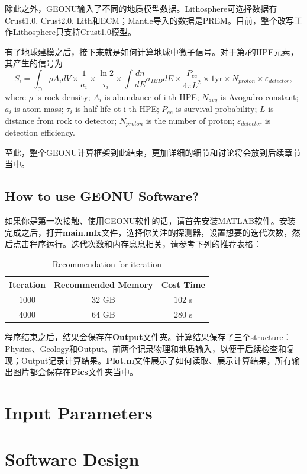			除此之外，GEONU输入了不同的地质模型数据。Lithosphere可选择数据有Crust1.0, Crust2.0, Lith和ECM；Mantle导入的数据是PREM。目前，整个改写工作Lithosphere只支持Crust1.0模型。\par
			有了地球建模之后，接下来就是如何计算地球中微子信号。对于第$i$的HPE元素，其产生的信号为
				\begin{equation}
					S_i
					= \int_{\oplus} \rho A_i dV \times \frac{1}{a_i} \times \frac{\ln 2}{\tau_i}\times \int \frac{dn}{dE} \sigma_{IBD} dE \times \frac{P_{ee}}{4\pi L^2} \times 1 \text{yr} \times N_{proton} \times \varepsilon_{detector},
				\end{equation}
			where $\rho$ is rock density; $A_i$ is abundance of i-th HPE; $N_{avg}$ is Avogadro constant; $a_i$ is atom mass; $\tau_i$ is half-life ot i-th HPE; $P_{ee}$ is survival probability; $L$ is distance from rock to detector; $N_{proton}$ is the number of proton; $\varepsilon_{detector}$ is detection efficiency.\par
			至此，整个GEONU计算框架到此结束，更加详细的细节和讨论将会放到后续章节当中。
		\section{How to use GEONU Software?}
			如果你是第一次接触、使用GEONU软件的话，请首先安装MATLAB软件。安装完成之后，打开\textbf{main.mlx}文件，选择你关注的探测器，设置想要的迭代次数，然后点击程序运行。迭代次数和内存息息相关，请参考下列的推荐表格：
				\begin{table}[H]
					\centering
					\caption{Recommendation for iteration}
					\begin{tabular}{|c|c|c|}
						\hline
						Iteration & Recommended Memory & Cost Time\\
						\hline
						$1000$ & $32$ GB & $102$ s\\
						\hline
						$4000$ & $64$ GB & $280$ s\\
						\hline
					\end{tabular}
				\end{table}
			程序结束之后，结果会保存在\textbf{Output}文件夹。计算结果保存了三个structure：Physics、Geology和Output。前两个记录物理和地质输入，以便于后续检查和复现；Output记录计算结果。\textbf{Plot.m}文件展示了如何读取、展示计算结果，所有输出图片都会保存在\textbf{Pics}文件夹当中。
	\chapter{Input Parameters}
	\chapter{Software Design}
				
